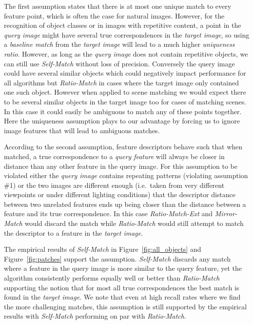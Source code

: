 \documentclass[review]{elsarticle}
\begin{document}
The first assumption states that there is at most one unique match to every feature point, which is often the case for natural images. However, for the recognition of object classes or in images with repetitive content, a point in the \emph{query image} might have several true correspondences in the \emph{target image}, so using a \emph{baseline match} from the \emph{target image} will lead to a much higher \emph{uniqueness ratio}. However, as long as the \emph{query image} does not contain repetitive objects, we can still use \emph{Self-Match} without loss of precision. Conversely the query image could have several similar objects which could negatively impact performance for all algorithms but \emph{Ratio-Match} in cases where the target image only contained one such object. However when applied to scene matching we would expect there to be several similar objects in the target image too for cases of matching scenes. In this case it could easily be ambiguous to match any of these points together. Here the uniqueness assumption plays to our advantage by forcing us to ignore image features that will lead to ambiguous matches.

According to the second assumption, feature descriptors behave such that when matched, a true correspondence to a \emph{query feature} will always be closer in distance than any other feature in the query image. For this assumption to be violated either the \emph{query image} contains repeating patterns (violating assumption \#1) or the two images are different enough (i.e.\ taken from very different viewpoints or under different lighting conditions) that the descriptor distance between two unrelated features ends up being closer than the distance between a feature and its true correspondence. In this case \emph{Ratio-Match-Ext} and \emph{Mirror-Match} would discard the match while \emph{Ratio-Match} would still attempt to match the descriptor to a feature in the \emph{target image}. 

The empirical results of \emph{Self-Match} in Figure~\ref{fig:all_objects} and Figure~\ref{fig:patches} support the assumption. \emph{Self-Match} discards any match where a feature in the query image is more similar to the query feature, yet the algorithm consistently performs equally well or better than \emph{Ratio-Match} supporting the notion that for most all true correspondences the best match is found in the \emph{target image}. We note that even at high recall rates where we find the more challenging matches, this assumption is still supported by the empirical results with \emph{Self-Match} performing on par with \emph{Ratio-Match}.
\end{document}
